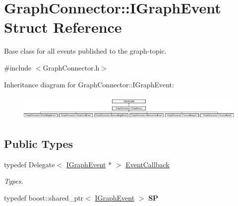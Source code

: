 \hypertarget{struct_graph_connector_1_1_i_graph_event}{}\section{Graph\+Connector\+:\+:I\+Graph\+Event Struct Reference}
\label{struct_graph_connector_1_1_i_graph_event}


Base class for all events published to the graph-\/topic.  




{\ttfamily \#include $<$Graph\+Connector.\+h$>$}

Inheritance diagram for Graph\+Connector\+:\+:I\+Graph\+Event\+:\begin{figure}[H]
\begin{center}
\leavevmode
\includegraphics[height=1.238938cm]{struct_graph_connector_1_1_i_graph_event}
\end{center}
\end{figure}
\subsection*{Public Types}
\begin{DoxyCompactItemize}
\item 
\mbox{\label{struct_graph_connector_1_1_i_graph_event_a0a8b47d20ad15b26911cd2029334d8dc}} 
typedef Delegate$<$ \hyperlink{struct_graph_connector_1_1_i_graph_event}{I\+Graph\+Event} $\ast$ $>$ \hyperlink{struct_graph_connector_1_1_i_graph_event_a0a8b47d20ad15b26911cd2029334d8dc}{Event\+Callback}
\begin{DoxyCompactList}\small\item\em Types. \end{DoxyCompactList}\item 
\mbox{\label{struct_graph_connector_1_1_i_graph_event_a7642ff57ccd63909a59919096ac46278}} 
typedef boost\+::shared\+\_\+ptr$<$ \hyperlink{struct_graph_connector_1_1_i_graph_event}{I\+Graph\+Event} $>$ {\bfseries SP}
\end{DoxyCompactItemize}
